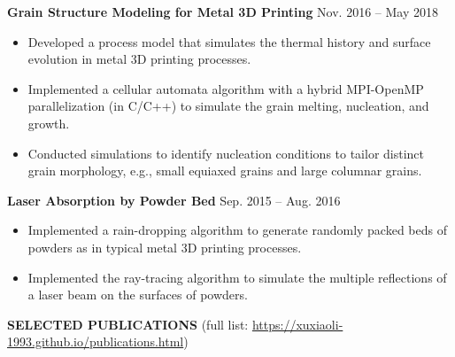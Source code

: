 \documentclass[11pt, letterpaper]{article}
\begin{document}
\vspace{3pt}

\textbf{Grain Structure Modeling for Metal 3D Printing} \hfill Nov. 2016 -- May 2018
\begin{itemize}[leftmargin=*, labelsep=5mm]
   \item Developed a process model that simulates the thermal history and surface evolution in metal
      3D printing processes.
   \item Implemented a cellular automata algorithm with a hybrid MPI-OpenMP parallelization (in
      C/C++) to simulate the grain melting, nucleation, and growth. 
   \item Conducted simulations to identify nucleation conditions to tailor distinct grain
      morphology, e.g., small equiaxed grains and large columnar grains.
\end{itemize}

\vspace{3pt}

\textbf{Laser Absorption by Powder Bed} \hfill Sep. 2015 -- Aug. 2016
\begin{itemize}[leftmargin=*, labelsep=5mm]
   \item Implemented a rain-dropping algorithm to generate randomly packed beds of powders as in
      typical metal 3D printing processes.
   \item Implemented the ray-tracing algorithm to simulate the multiple reflections of a laser beam
      on the surfaces of powders.
\end{itemize}

\vspace{9pt}

\textbf{SELECTED PUBLICATIONS} \hfill (full list:  
\href{https://xuxiaoli-1993.github.io/publications.html}
{https://xuxiaoli-1993.github.io/publications.html})

\fullrule
\end{document}
